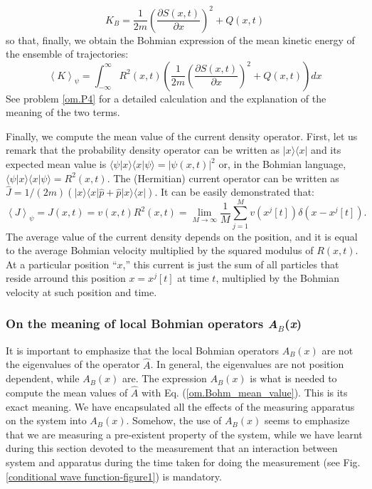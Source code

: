 \documentclass[nofootinbib, secnumarabic, amsmath, nobibnotes,11pt,aps,pra, floatfix]{revtex4-1}
\newcommand{\ket}[1]{\ensuremath{|#1\rangle}}
\newcommand{\bra}[1]{\ensuremath{\langle#1|}}
\newcommand{\braket}[2]{\langle#1|#2\rangle}
\newcommand{\fref}[1]{Fig. \ref{#1}}
\newcommand{\eref}[1]{Eq. (\ref{#1})}
\newcommand{\abs}[1]{\left| #1 \right|} %
\newcommand{\avg}[1]{\left\langle #1 \right\rangle} %
\begin{document}
\begin{equation}
\label{om.local_kinetic_energy_mean_B_bis}
K_B = \frac {1} {2m}\left(\frac {\partial S(x,t)} {\partial x} \right)^2 + Q(x,t)
\end{equation}
so that, finally, we obtain the Bohmian expression of the mean kinetic energy of the ensemble of trajectories:
\begin{equation}
\label{om.kinetic_energy_mean_B}
\avg{K}_{\psi} = \int_{-\infty}^{\infty} R^2(x,t) \left( \frac {1} {2m} \left(\frac {\partial S(x,t)} {\partial x} \right)^2 + Q(x,t)\right) dx
\end{equation}
See problem \ref{om.P4} for a detailed calculation and the explanation of the meaning of the two terms.

Finally, we compute the mean value of the current density operator. First, let us remark that the probability density operator can be written as $\ket{x}\bra{x}$ and its expected mean value is $\braket{\psi}{x} \braket{x}{\psi} = \abs{\psi(x,t)}^2$ or, in the Bohmian language, $\braket{\psi}{x} \braket{x}{\psi} = R^2(x,t)$. The (Hermitian) current operator can be written as $\hat{J} = 1/(2m) (\ket{x}\bra{x}\hat{p} + \hat{p}\ket{x}\bra{x})$. It can be easily demonstrated that:
\begin{equation}
\avg{J}_{\psi}=J(x,t)=v(x,t) R^2(x,t)=\lim_{M\rightarrow\infty} \frac {1} {M} \sum_{j=1}^{M} v(x^j[t]) \delta(x-x^j[t]).
\end{equation}
The average value of the current density depends on the position,
and it is equal to the average Bohmian velocity multiplied by the
squared modulus of $R(x,t)$. At a particular position ``$x$,'' this
current is just the sum of all particles that reside arround this
position $x = x^j[t]$ at time $t$, multiplied by the Bohmian velocity at such position and time. 

\subsubsection{On the meaning of local Bohmian operators \textit{A}$_\textit{B}$(\textit{x})}

It is important to emphasize that the local Bohmian operators
$A_B(x)$ are not the eigenvalues of the operator $\hat{A}$. In
general, the eigenvalues are not position dependent, while $A_B(x)$
are. The expression $A_B(x)$ is what is needed to compute the mean
values of $\hat{A}$ with \eref{om.Bohm_mean_value}. This is its
exact meaning. We have encapsulated all the effects of the measuring apparatus on the system into $A_B(x)$. Somehow, the use of $A_B(x)$ seems to emphasize that we are measuring a pre-existent property of the system, while we have learnt during this section devoted to the measurement that an interaction between system and apparatus during the time taken for doing the measurement (see \fref{conditional wave function-figure1}) is mandatory. 
\end{document}
